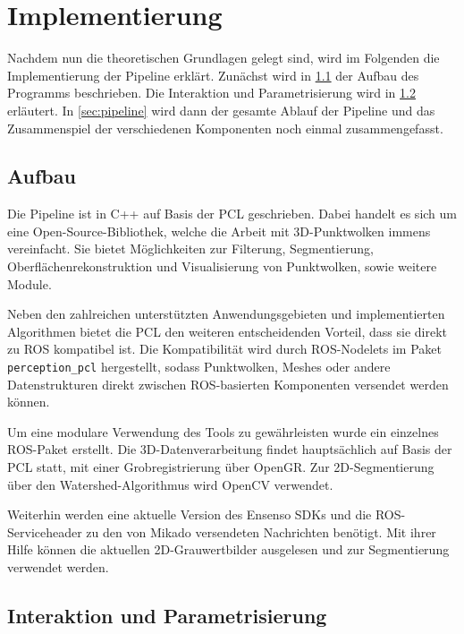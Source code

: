 
\chapter{Implementierung}
\label{ch:implementierung}

Nachdem nun die theoretischen Grundlagen gelegt sind, wird im Folgenden die Implementierung der Pipeline erklärt.
Zunächst wird in \ref{sec:aufbau} der Aufbau des Programms beschrieben.
Die Interaktion und Parametrisierung wird in \ref{sec:interaktion} erläutert.
In \ref{sec:pipeline} wird dann der gesamte Ablauf der Pipeline und das Zusammenspiel der verschiedenen Komponenten noch einmal zusammengefasst.



\section{Aufbau}
\label{sec:aufbau}

Die Pipeline ist in C++ auf Basis der \ac{PCL} \cite{rusu2011pcl} geschrieben.
Dabei handelt es sich um eine Open-Source-Bibliothek, welche die Arbeit mit 3D-Punktwolken immens vereinfacht.
Sie bietet Möglichkeiten zur Filterung, Segmentierung, Oberflächenrekonstruktion und Visualisierung von Punktwolken, sowie weitere Module.

Neben den zahlreichen unterstützten Anwendungsgebieten und implementierten Algorithmen bietet die \ac{PCL} den weiteren entscheidenden Vorteil, dass sie direkt zu \ac{ROS} \cite{quigley2009ros} kompatibel ist.
Die Kompatibilität wird durch ROS-Nodelets im Paket \texttt{perception\_pcl} hergestellt, sodass Punktwolken, Meshes oder andere Datenstrukturen direkt zwischen \ac{ROS}-basierten Komponenten versendet werden können.

Um eine modulare Verwendung des Tools zu gewährleisten wurde ein einzelnes \ac{ROS}-Paket erstellt.
Die 3D-Datenverarbeitung findet hauptsächlich auf Basis der \ac{PCL} statt, mit einer Grobregistrierung über \ac{OpenGR}.
Zur 2D-Segmentierung über den Watershed-Algorithmus wird OpenCV verwendet.

Weiterhin werden eine aktuelle Version des Ensenso SDKs und die \ac{ROS}-Serviceheader zu den von Mikado versendeten Nachrichten benötigt.
Mit ihrer Hilfe können die aktuellen 2D-Grauwertbilder ausgelesen und zur Segmentierung verwendet werden.



\section{Interaktion und Parametrisierung}
\label{sec:interaktion}

